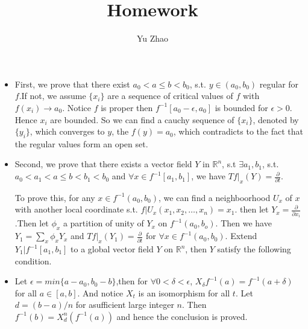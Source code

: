 \documentclass{article}
\author{Yu Zhao}
\title{Homework}
\newcommand{\R}{\mathbb{R}}
\begin{document}
\maketitle{}
\begin{itemize}
\item
  First, we prove that there exist $a_0<a \leq b <b_0$, s.t. $y \in (a_0, b_0)$ regular for $f$.If not, we assume $\{x_i\}$ are a sequence of critical values of $f$ with $f(x_i)\to a_0$. Notice $f$ is proper  then $f^{-1}[a_0-\epsilon, a_0]$ is bounded for $\epsilon>0$. Hence $x_i$ are bounded. So we can find a cauchy sequence of $\{x_i\}$, denoted by $\{y_i\}$, which converges to $y$, the  $f(y)=a_0$, which contradicts to the fact that the regular values form an open set.

\item 
  Second, we prove that there exists a vector field $Y$ in $\R^n$, s.t $\exists a_1, b_1$, s.t. $a_0<a_1<a\leq b<b_1<b_0$ and $\forall x\in f^{-1}[a_1,b_1]$, we have $Tf|_x(Y)=\frac{\partial}{\partial t}$.

To prove this, for any $x\in f^{-1}(a_0,b_0)$, we can find a neighboorhood $U_x$ of $x$ with another local coordinate s.t. $f|U_x(x_1,x_2,\ldots,x_n)=x_1$. then let $Y_x=\frac{\partial}{\partial x_i}$.Then let $\phi_x$ a partition of unity of $Y_x$ on $f^{-1}(a_0,b_o)$. Then we have  $Y_1=\sum_x \phi_xY_x$ and $Tf|_x(Y_1)=\frac{\partial}{\partial t}$ for $\forall x\in f^{-1}(a_0,b_0)$. Extend $Y_1|f^{-1}[a_1,b_1]$ to a global vector field $Y$ on $\R^n$, then $Y$ satisfy the following condition.

\item Let $\epsilon = min\{a-a_0,b_0-b\}$,then for $\forall 0<\delta <\epsilon$, $X_\delta f^{-1}(a)=f^{-1}(a+\delta)$ for all $a\in [a,b]$. And notice $X_t$ is an isomorphism for all $t$. Let $d=(b-a)/n$ for asufficient large integer $n$. Then $f^{-1}(b)=X_d^n(f^{-1}(a))$ and hence the conclusion is proved.
\end{itemize}
\end{document}
